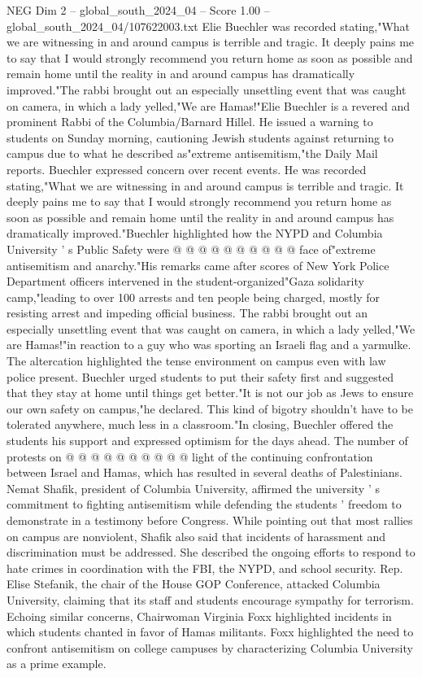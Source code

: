\begin{textsample}{NEG Dim 2 – global\_south\_2024\_04 – Score 1.00 – global\_south\_2024\_04/107622003.txt}  \label{ex:f2_neg_296}
Elie Buechler was recorded stating,"What we are witnessing in and around campus is terrible and tragic.
It deeply pains me to say that I would strongly recommend you return home as soon as possible and remain home until the reality in and around campus has dramatically improved."The rabbi brought out an especially unsettling event that was caught on camera, in which a lady yelled,"We are Hamas!"Elie Buechler is a revered and prominent Rabbi of the Columbia/Barnard Hillel.
He issued a warning to students on Sunday morning, cautioning Jewish students against returning to campus due to what he described as"extreme antisemitism,"the Daily Mail reports.
Buechler expressed concern over recent events.
He was recorded stating,"What we are witnessing in and around campus is terrible and tragic.
It deeply pains me to say that I would strongly recommend you return home as soon as possible and remain home until the reality in and around campus has dramatically improved."Buechler highlighted how the NYPD and Columbia University ' s Public Safety were @ @ @ @ @ @ @ @ @ @ face of"extreme antisemitism and anarchy."His remarks came after scores of New York Police Department officers intervened in the student-organized"Gaza solidarity camp,"leading to over 100 arrests and ten people being charged, mostly for resisting arrest and impeding official business.
The rabbi brought out an especially unsettling event that was caught on camera, in which a lady yelled,"We are Hamas!"in reaction to a guy who was sporting an Israeli flag and a yarmulke.
The altercation highlighted the tense environment on campus even with law police present.
Buechler urged students to put their safety first and suggested that they stay at home until things get better."It is not our job as Jews to ensure our own safety on campus,"he declared.
This kind of bigotry shouldn't have to be tolerated anywhere, much less in a classroom."In closing, Buechler offered the students his support and expressed optimism for the days ahead.
The number of protests on @ @ @ @ @ @ @ @ @ @ light of the continuing confrontation between Israel and Hamas, which has resulted in several deaths of Palestinians.
Nemat Shafik, president of Columbia University, affirmed the university ' s commitment to fighting antisemitism while defending the students ' freedom to demonstrate in a testimony before Congress.
While pointing out that most rallies on campus are nonviolent, Shafik also said that incidents of harassment and discrimination must be addressed.
She described the ongoing efforts to respond to hate crimes in coordination with the FBI, the NYPD, and school security.
Rep.
Elise Stefanik, the chair of the House GOP Conference, attacked Columbia University, claiming that its staff and students encourage sympathy for terrorism.
Echoing similar concerns, Chairwoman Virginia Foxx highlighted incidents in which students chanted in favor of Hamas militants.
Foxx highlighted the need to confront antisemitism on college campuses by characterizing Columbia University as a prime example.

\end{textsample}
